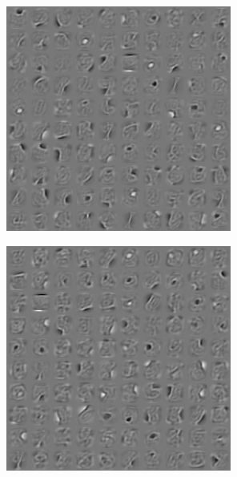 \documentclass[notitlepage]{revtex4-1}
\begin{document}
\begin{figure}
\begin{subfigure}{.25\linewidth}
    \caption{}
    \label{fig:w_tap20_50}
  \end{subfigure}\par\medskip
  \begin{subfigure}{.25\linewidth}
    \includegraphics[width=\linewidth]{features_pcd.png}
    \caption{}
    \label{fig:features_pcd}
  \end{subfigure}
  \begin{subfigure}{.25\linewidth}
    \includegraphics[width=\linewidth]{features_tap.png}

\end{subfigure}
\end{figure}
\end{document}
